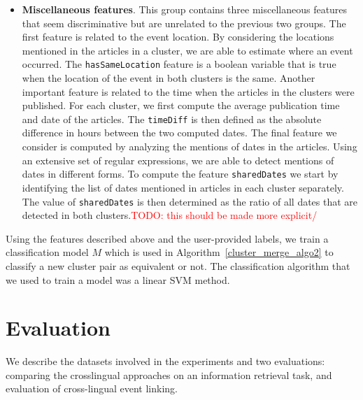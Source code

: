 \documentclass[twoside,11pt]{article}
\newcommand{\todo}[1]{\textcolor{red}{TODO: #1}}
\begin{document}
\begin{itemize}
\item {\bf Miscellaneous features}. This group contains three miscellaneous features that seem discriminative but are unrelated to the previous two groups. The first feature is related to the event location. By considering the locations mentioned in the articles in a cluster, we are able to estimate where an event occurred. The \texttt{hasSameLocation} feature is a boolean variable that is true when the location of the event in both clusters is the same. Another important feature is related to the time when the articles in the clusters were published. For each cluster, we first compute the average publication time and date of the articles. The \texttt{timeDiff} is then defined as the absolute difference in hours between the two computed dates. The final feature we consider is computed by analyzing the mentions of dates in the articles. Using an extensive set of regular expressions, we are able to detect mentions of dates in different forms. To compute the feature \texttt{sharedDates} we start by identifying the list of dates mentioned in articles in each cluster separately. The value of \texttt{sharedDates} is then determined as the ratio of all dates that are detected in both clusters.\todo{this should be made more explicit/}

\end{itemize}

Using the  features described above and the user-provided labels, we train a classification model $M$ which is used in Algorithm~\ref{cluster_merge_algo2} to classify a new cluster pair as equivalent or not. The classification algorithm that we used to train a model was a linear SVM method.




\section{Evaluation}

We describe the datasets involved in the experiments and two evaluations: comparing the crosslingual approaches on an information retrieval task, and evaluation of cross-lingual event linking.
\end{document}
